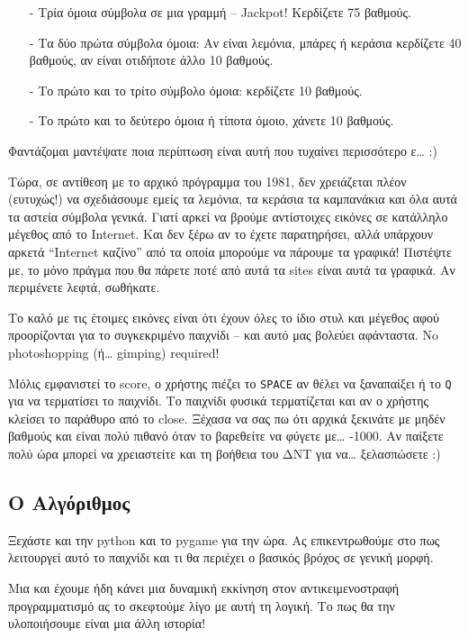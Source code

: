\begin{itemize}
\item[-] Τρία όμοια σύμβολα σε μια γραμμή -- Jackpot! Κερδίζετε 75 βαθμούς.
\item[-] Τα δύο πρώτα σύμβολα όμοια: Αν είναι λεμόνια, μπάρες ή κεράσια κερδίζετε 40 βαθμούς, αν είναι οτιδήποτε άλλο 10 βαθμούς.
\item[-]Το πρώτο και το τρίτο σύμβολο όμοια: κερδίζετε 10 βαθμούς.
\item[-]Το πρώτο και το δεύτερο όμοια ή τίποτα όμοιο, χάνετε 10 βαθμούς.
\end{itemize}
%
Φαντάζομαι μαντέψατε ποια περίπτωση είναι αυτή που τυχαίνει περισσότερο ε\ldots{} :)

Τώρα, σε αντίθεση με το αρχικό πρόγραμμα του 1981, δεν χρειάζεται πλέον (ευτυχώς!) να σχεδιάσουμε εμείς τα λεμόνια, τα κεράσια τα καμπανάκια και όλα αυτά τα αστεία σύμβολα γενικά. Γιατί αρκεί να βρούμε αντίστοιχες εικόνες σε κατάλληλο μέγεθος από το Internet. Και δεν ξέρω αν το έχετε παρατηρήσει, αλλά υπάρχουν αρκετά ``Internet καζίνο'' από τα οποία μπορούμε να πάρουμε τα γραφικά! Πιστέψτε με, το μόνο πράγμα που θα πάρετε ποτέ από αυτά τα sites είναι αυτά τα γραφικά. Αν περιμένετε λεφτά, σωθήκατε.

Το καλό με τις έτοιμες εικόνες είναι ότι έχουν όλες το ίδιο στυλ και μέγεθος
αφού προορίζονται για το συγκεκριμένο παιχνίδι -- και αυτό μας βολεύει αφάνταστα. No photoshopping (ή\ldots{} gimping) required!

Μόλις εμφανιστεί το score, ο χρήστης πιέζει το {\tt SPACE} αν θέλει να ξαναπαίξει ή το {\tt Q} για να τερματίσει το παιχνίδι. Το παιχνίδι φυσικά τερματίζεται και αν ο χρήστης κλείσει το παράθυρο από το close. Ξέχασα να σας πω ότι αρχικά ξεκινάτε με μηδέν βαθμούς και είναι πολύ πιθανό όταν το βαρεθείτε να φύγετε με\ldots{} -1000. Αν παίξετε πολύ ώρα μπορεί να χρειαστείτε και τη βοήθεια του ΔΝΤ για να\ldots{} ξελασπώσετε :)
%
\subsection{Ο Αλγόριθμος}
%
Ξεχάστε και την python και το pygame για την ώρα. Ας επικεντρωθούμε στο πως λειτουργεί αυτό το παιχνίδι και τι θα περιέχει ο βασικός βρόχος σε γενική μορφή.

Μια και έχουμε ήδη κάνει μια δυναμική εκκίνηση στον αντικειμενοστραφή προγραμματισμό ας το σκεφτούμε λίγο με αυτή τη λογική. Το πως θα την υλοποιήσουμε είναι μια άλλη ιστορία!

